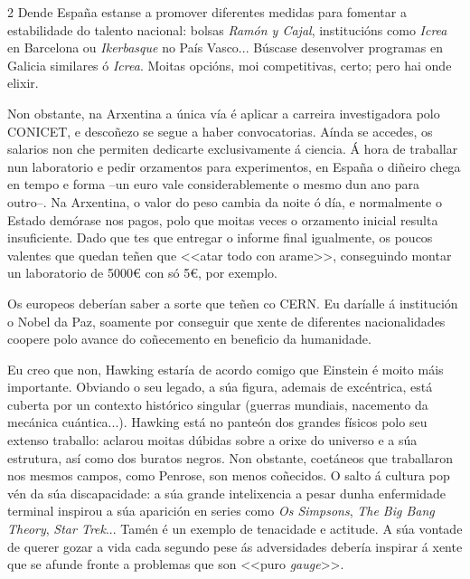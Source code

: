 \begin{multicols}{2}
Dende España estanse a promover diferentes medidas para fomentar a
estabilidade do talento nacional: bolsas \emph{Ramón y Cajal}, institucións
como \emph{Icrea} en Barcelona ou \emph{Ikerbasque} no País Vasco... Búscase
desenvolver programas en Galicia similares ó \emph{Icrea}. Moitas opcións, moi
competitivas, certo; pero hai onde elixir.

Non obstante, na Arxentina a única vía é aplicar a carreira investigadora polo
CONICET, e descoñezo se segue a haber convocatorias. Aínda se accedes, os
salarios non che permiten dedicarte exclusivamente á ciencia. Á hora de
traballar nun laboratorio e pedir orzamentos para experimentos, en
España o diñeiro chega en tempo e forma --un euro vale considerablemente o
mesmo dun ano para outro--. Na Arxentina, o valor do peso cambia da
noite ó día, e normalmente o Estado demórase nos pagos, polo que moitas
veces o orzamento inicial resulta insuficiente. Dado que tes que entregar o
informe final igualmente, os poucos valentes que quedan teñen que <<atar todo
con arame>>, conseguindo montar un laboratorio de 5000€ con só 5€, por exemplo.


Os europeos deberían saber a sorte que teñen co CERN. Eu daríalle á
institución o Nobel da Paz, soamente por conseguir que xente de diferentes
nacionalidades coopere polo avance do coñecemento en beneficio da humanidade.


Eu creo que non, Hawking estaría de acordo comigo que Einstein é moito máis
importante. Obviando o seu legado, a súa figura, ademais de excéntrica, está
cuberta por un contexto histórico singular (guerras mundiais, nacemento da
mecánica cuántica...). Hawking está no panteón dos grandes físicos
polo seu extenso traballo: aclarou moitas dúbidas sobre a orixe do universo e a
súa estrutura, así como dos buratos negros. Non obstante, coetáneos que
traballaron nos mesmos campos, como Penrose, son menos coñecidos. O salto á
cultura pop vén da súa discapacidade: a súa grande intelixencia a pesar dunha
enfermidade terminal inspirou a súa aparición en series como \textit{Os
Simpsons}, \textit{The Big Bang Theory}, \textit{Star Trek}... Tamén é
un exemplo de tenacidade e actitude. A súa vontade de querer gozar a vida cada
segundo pese ás adversidades debería inspirar á xente que se afunde fronte a
problemas que son <<puro \emph{gauge}>>.


\end{multicols}
